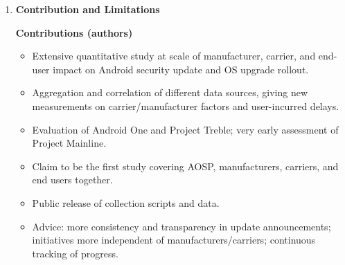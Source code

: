\documentclass[11pt,a4paper]{article}
\newcommand{\entrypart}[1]{\textbf{\color{accent}#1}\par\vspace{2pt}}
\begin{document}
\begin{enumerate}
\begin{itemize}[leftmargin=*, itemsep=1pt, topsep=2pt]
        \begin{itemize}[itemsep=0pt]
            \item 48.15\% of Treble devices have more than nine build numbers vs.\ 16.55\% of all active devices.
            \item Treble OS: 35.65\% Android 9, 52.43\% Android 10; 11.91\% still on Android 8.
            \item Security update latency: 19 days average for Treble vs.\ 26 days for non-Treble (7 days faster); median delay of 19 days still.
        \end{itemize}
        \item \textbf{Project Mainline:}
        \begin{itemize}[itemsep=0pt]
            \item 140,720 Mainline-supported devices (11.05\% of active devices); 86.58\% of them are Google Pixel.
            \item Direct effect not measurable (build numbers do not change).
            \item Mainline-compatible devices excluding Pixel: 1.5\%.
        \end{itemize}
        \item \textbf{Internal inconsistencies in text:} abstract says ``median delay of 11 days'' and Treble 7 days faster; Section 5.2 text says Treble ``average latency is 19 days'' and the abstract calls it average, while Section 7 also says median 19 days. Not Specified which is correct.
    \end{itemize}

    \item \entrypart{Contribution and Limitations}

    \textbf{Contributions (authors)}
    \begin{itemize}[leftmargin=*, itemsep=1pt, topsep=2pt]
        \item Extensive quantitative study at scale of manufacturer, carrier, and end-user impact on Android security update and OS upgrade rollout.
        \item Aggregation and correlation of different data sources, giving new measurements on carrier/manufacturer factors and user-incurred delays.
        \item Evaluation of Android One and Project Treble; very early assessment of Project Mainline.
        \item Claim to be the first study covering AOSP, manufacturers, carriers, and end users together.
        \item Public release of collection scripts and data.
        \item Advice: more consistency and transparency in update announcements; initiatives more independent of manufacturers/carriers; continuous tracking of progress.
    \end{itemize}


\end{enumerate}
\end{document}
